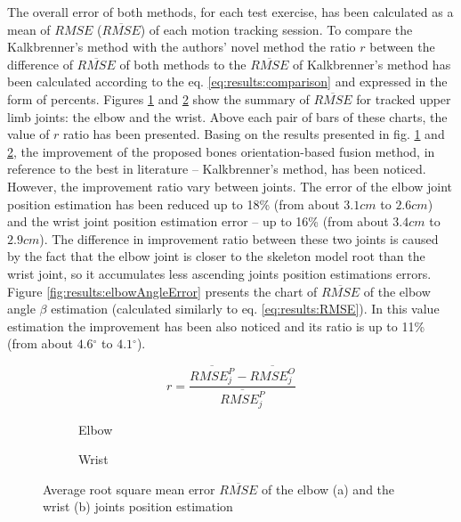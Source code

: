 \documentclass[sensors,article,submit,moreauthors,pdftex,10pt,a4paper]{mdpi}
\newcommand{\degree}{\ensuremath{{}^{\circ}}\xspace}
\begin{document}
The overall error of both methods, for each test exercise, has been calculated as a mean of $RMSE$ ($\overline{RMSE}$) of each motion tracking session. To compare the Kalkbrenner’s method with the authors’ novel method the ratio $r$ between the difference of $\overline{RMSE}$ of both methods to the $\overline{RMSE}$ of Kalkbrenner’s method has been calculated according to the eq. \ref{eq:results:comparison} and expressed in the form of percents. Figures \ref{fig:results:positionError:a} and \ref{fig:results:positionError:b} show the summary of  $\overline{RMSE}$ for tracked upper limb joints: the elbow and the wrist. Above each pair of bars of these charts, the value of $r$ ratio has been presented. Basing on the results presented in fig. \ref{fig:results:positionError:a} and \ref{fig:results:positionError:b}, the improvement of the proposed bones orientation-based fusion method, in reference to the best in literature -- Kalkbrenner’s method, has been noticed. However, the improvement ratio vary between joints. The error of the elbow joint position estimation has been reduced up to 18\% (from about $3.1cm$ to $2.6cm$) and the wrist joint position estimation error -- up to 16\% (from about $3.4cm$ to $2.9cm$). The difference in improvement ratio between these two joints is caused by the fact that the elbow joint is closer to the skeleton model root than the wrist joint, so it accumulates less ascending joints position estimations errors. Figure \ref{fig:results:elbowAngleError} presents the chart of $\overline{RMSE}$ of the elbow angle $\beta$ estimation (calculated similarly to eq. \ref{eq:results:RMSE}). In this value estimation the improvement has been also noticed and its ratio is up to 11\% (from about $4.6\degree$ to $4.1\degree$).
		
\begin{equation}
	r = \frac{\overline{RMSE^P_j} - \overline{RMSE^O_j}}{\overline{RMSE^P_j}}
	\label{eq:results:comparison}
\end{equation}
		
\begin{figure}[H] %
	\centering
	\begin{subfigure}[b]{0.49\textwidth}
		\centering
		
		\caption{Elbow}
		\label{fig:results:positionError:a}
	\end{subfigure} \hfill
	\begin{subfigure}[b]{0.49\textwidth}
		\centering
		
		\caption{Wrist}
		\label{fig:results:positionError:b}
	\end{subfigure}
	\caption{Average root square mean error $\overline{RMSE}$ of the elbow (a) and the wrist (b) joints position estimation}
	\label{fig:results:positionError}
\end{figure}   
		
\end{document}
